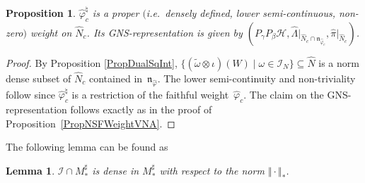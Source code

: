 \documentclass[pdftex]{sigma}
\numberwithin{equation}{section}
\newtheorem{prop}[thm]{Proposition}
\newtheorem{lem}[thm]{Lemma}
\theoremstyle{definition}
\newcommand{\cHil}{\mathcal{H}}
\begin{document}
\begin{prop}\label{PropNSFWeightReduced}
 $\hat{\varphi}_c^\natural$  is a   proper $($i.e.\ densely defined, lower semi-continuous, non-zero$)$ weight on $\hat{N}_c$. Its GNS-representation is given by $(P_\gamma P_\beta \cHil, \hat{\Lambda} \vert_{\hat{N}_c \cap \mathfrak{n}_{\hat{\varphi}_c}}, \hat{\pi}\vert_{\hat{N}_c})$.
\end{prop}
\begin{proof}
By Proposition \ref{PropDualSqInt}, $\{ (\tilde{\omega} \otimes \iota)(W) \mid \omega \in \mathcal{I}_N \} \subseteq \hat{N}$ is a norm dense subset of $\hat{N}_c$ contained in~$\mathfrak{n}_{\hat{\varphi}}$. The lower semi-continuity and non-triviality  follow since  $\hat{\varphi}_c^\natural$ is a restriction of the faithful weight~$\hat{\varphi}_c$. The claim on the GNS-representation follows exactly as in the proof of Proposi\-tion~\ref{PropNSFWeightVNA}.
\end{proof}

The following lemma can be found as \cite[Lemma 4.2]{Kus}

\begin{lem}\label{LemDensity}
 $\mathcal{I} \cap M_\ast^\sharp$ is dense in $M_\ast^\sharp$ with respect to the norm $\Vert \cdot \Vert_\ast$.
\end{lem}
\end{document}
